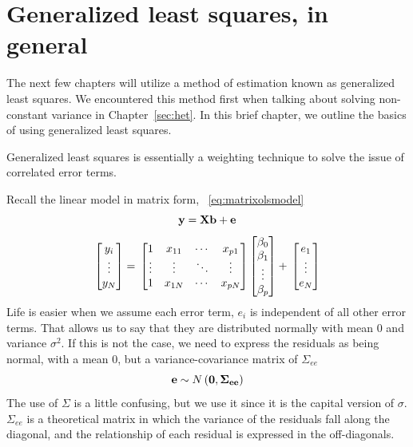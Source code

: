 

\chapter{Generalized least squares, in general}
\label{sec:glmchapter}

The next few chapters will utilize a method of estimation known as generalized least squares. We encountered this method first when talking about solving non-constant variance in Chapter~\ref{sec:het}. In this brief chapter, we outline the basics of using generalized least squares.

Generalized least squares is essentially a weighting technique to solve the issue of correlated error terms.

Recall the linear model in matrix form, ~\eqref{eq:matrixolsmodel}
\[
{\bf{y=Xb+e}}
\]
\[
\begin{bmatrix}
y_i \\
\vdots \\
y_N \\
\end{bmatrix}
= \\
\begin{bmatrix}
1&x_{11}&\cdots&x_{p1} \\
\vdots&\vdots&\ddots&\vdots \\
1&x_{1N}&\cdots&x_{pN} \\
\end{bmatrix}
\begin{bmatrix}
\beta_0 \\
\beta_1 \\
\vdots \\
\beta_p \\
\end{bmatrix}
+ \\
\begin{bmatrix}
e_1 \\
\vdots \\
e_N \\
\end{bmatrix}
\]
Life is easier when we assume each error term, $e_i$ is independent of all other error terms. That allows us to say that they are distributed normally with mean 0 and variance $\sigma^2$. If this is not the case, we need to express the residuals as being normal, with a mean 0, but a variance-covariance matrix of $\Sigma_{ee}$
\begin{equation}
{\bf e} \sim N\left({\bf 0,\Sigma_{ee}}\right)
\end{equation}
The use of $\Sigma$ is a little confusing, but we use it since it is the capital version of $\sigma$. $\Sigma_{ee}$ is a theoretical matrix in which the variance of the residuals fall along the diagonal, and the relationship of each residual is expressed in the off-diagonals.

